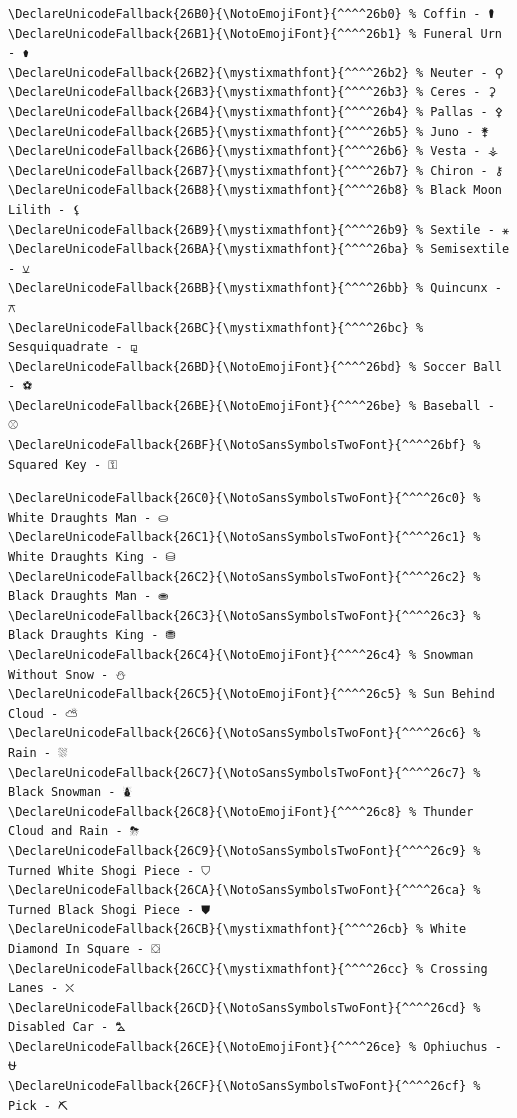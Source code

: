 \documentclass[12pt, twoside]{article}
\begin{document}
\newpage
\begin{verbatim}
\DeclareUnicodeFallback{26B0}{\NotoEmojiFont}{^^^^26b0} % Coffin - ⚰
\DeclareUnicodeFallback{26B1}{\NotoEmojiFont}{^^^^26b1} % Funeral Urn - ⚱
\DeclareUnicodeFallback{26B2}{\mystixmathfont}{^^^^26b2} % Neuter - ⚲
\DeclareUnicodeFallback{26B3}{\mystixmathfont}{^^^^26b3} % Ceres - ⚳
\DeclareUnicodeFallback{26B4}{\mystixmathfont}{^^^^26b4} % Pallas - ⚴
\DeclareUnicodeFallback{26B5}{\mystixmathfont}{^^^^26b5} % Juno - ⚵
\DeclareUnicodeFallback{26B6}{\mystixmathfont}{^^^^26b6} % Vesta - ⚶
\DeclareUnicodeFallback{26B7}{\mystixmathfont}{^^^^26b7} % Chiron - ⚷
\DeclareUnicodeFallback{26B8}{\mystixmathfont}{^^^^26b8} % Black Moon Lilith - ⚸
\DeclareUnicodeFallback{26B9}{\mystixmathfont}{^^^^26b9} % Sextile - ⚹
\DeclareUnicodeFallback{26BA}{\mystixmathfont}{^^^^26ba} % Semisextile - ⚺
\DeclareUnicodeFallback{26BB}{\mystixmathfont}{^^^^26bb} % Quincunx - ⚻
\DeclareUnicodeFallback{26BC}{\mystixmathfont}{^^^^26bc} % Sesquiquadrate - ⚼
\DeclareUnicodeFallback{26BD}{\NotoEmojiFont}{^^^^26bd} % Soccer Ball - ⚽
\DeclareUnicodeFallback{26BE}{\NotoEmojiFont}{^^^^26be} % Baseball - ⚾
\DeclareUnicodeFallback{26BF}{\NotoSansSymbolsTwoFont}{^^^^26bf} % Squared Key - ⚿

\end{verbatim}
\newpage
\begin{verbatim}
\DeclareUnicodeFallback{26C0}{\NotoSansSymbolsTwoFont}{^^^^26c0} % White Draughts Man - ⛀
\DeclareUnicodeFallback{26C1}{\NotoSansSymbolsTwoFont}{^^^^26c1} % White Draughts King - ⛁
\DeclareUnicodeFallback{26C2}{\NotoSansSymbolsTwoFont}{^^^^26c2} % Black Draughts Man - ⛂
\DeclareUnicodeFallback{26C3}{\NotoSansSymbolsTwoFont}{^^^^26c3} % Black Draughts King - ⛃
\DeclareUnicodeFallback{26C4}{\NotoEmojiFont}{^^^^26c4} % Snowman Without Snow - ⛄
\DeclareUnicodeFallback{26C5}{\NotoEmojiFont}{^^^^26c5} % Sun Behind Cloud - ⛅
\DeclareUnicodeFallback{26C6}{\NotoSansSymbolsTwoFont}{^^^^26c6} % Rain - ⛆
\DeclareUnicodeFallback{26C7}{\NotoSansSymbolsTwoFont}{^^^^26c7} % Black Snowman - ⛇
\DeclareUnicodeFallback{26C8}{\NotoEmojiFont}{^^^^26c8} % Thunder Cloud and Rain - ⛈
\DeclareUnicodeFallback{26C9}{\NotoSansSymbolsTwoFont}{^^^^26c9} % Turned White Shogi Piece - ⛉
\DeclareUnicodeFallback{26CA}{\NotoSansSymbolsTwoFont}{^^^^26ca} % Turned Black Shogi Piece - ⛊
\DeclareUnicodeFallback{26CB}{\mystixmathfont}{^^^^26cb} % White Diamond In Square - ⛋
\DeclareUnicodeFallback{26CC}{\mystixmathfont}{^^^^26cc} % Crossing Lanes - ⛌
\DeclareUnicodeFallback{26CD}{\NotoSansSymbolsTwoFont}{^^^^26cd} % Disabled Car - ⛍
\DeclareUnicodeFallback{26CE}{\NotoEmojiFont}{^^^^26ce} % Ophiuchus - ⛎
\DeclareUnicodeFallback{26CF}{\NotoSansSymbolsTwoFont}{^^^^26cf} % Pick - ⛏

\end{verbatim}
\end{document}

